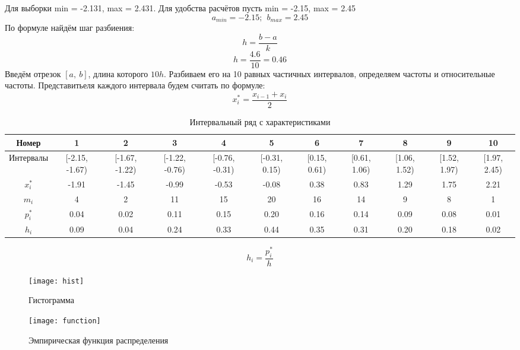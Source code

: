 \documentclass{article}
\begin{document}
Для выборки min = -2.131, max = 2.431.
Для удобства расчётов пусть min = -2.15, max = 2.45
\begin{equation*}
    a_{min} = -2.15;\ \  b_{max} = 2.45
\end{equation*}
По формуле найдём шаг разбиения:
\begin{equation}
    h = \frac{b-a}{k}
\end{equation}
\begin{equation*}
    h = \frac{4.6}{10} = 0.46
\end{equation*}
Введём отрезок $[a,\ b]$, длина которого $10h$. Разбиваем его на 10 равных частичных интервалов, определяем частоты и относительные частоты. Представитьеля каждого интервала будем считать по формуле:
\begin{equation}
    x_i^* = \frac{x_{i-1}+x_i}{2}
\end{equation}

\begin{table}[h]
    \scriptsize
    \begin{tabular}{|*{11}{c|}}
        \hline
        Номер & 1  & 2  & 3  & 4  & 5  & 6  & 7  & 8  & 9  & 10 \\
        \hline
        Интервалы &[-2.15, -1.67) & \tiny[-1.67, -1.22) & \tiny[-1.22, -0.76) & \tiny[-0.76, -0.31) & \tiny[-0.31, 0.15) & \tiny[0.15, 0.61) & \tiny[0.61, 1.06) & \tiny[1.06, 1.52) & \tiny[1.52, 1.97) & \tiny[1.97, 2.45) \\
        \hline
        $x_i^*$& -1.91 & -1.45 & -0.99 & -0.53 & -0.08 & 0.38 & 0.83 & 1.29 & 1.75 & 2.21\\
        \hline
        $m_i$& 4 & 2 & 11 & 15 & 20 & 16 & 14 & 9 & 8 & 1	\\
        \hline
        $p_i^*$& 0.04 & 0.02 & 0.11 & 0.15 & 0.20 & 0.16 & 0.14 & 0.09 & 0.08 & 0.01\\
        \hline
        $h_i$& 0.09 & 0.04 & 0.24 & 0.33 & 0.44 & 0.35 & 0.31 & 0.20 & 0.18 & 0.02 \\
        \hline
    \end{tabular}
    \caption{Интервальный ряд с характеристиками}
\end{table}

\[h_i = \frac{p_i^*}{h}\]
\begin{figure}[h!]
    \begin{center}
    \texttt{[image: hist]}
    \caption{\small Гистограмма}
    \end{center}
    \begin{center}
    \texttt{[image: function]}
    \caption{\small Эмпирическая функция распределения}
    \end{center}
\end{figure}
\end{document}
